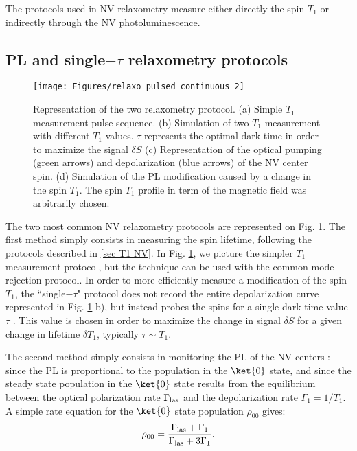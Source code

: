 \documentclass[a4paper,11pt]{report}
\begin{document}
The protocols used in NV relaxometry measure either directly the spin $T_1$ or indirectly through the NV photoluminescence.

\subsection{PL and single$-\tau$ relaxometry protocols}
\begin{figure}[h]
\centering
\texttt{[image: Figures/relaxo\_pulsed\_continuous\_2]}
\caption{Representation of the two relaxometry protocol. (a) Simple $T_1$ measurement pulse sequence. (b) Simulation of two $T_1$ measurement with different $T_1$ values. $\tau$ represents the optimal dark time in order to maximize the signal $\delta S$ (c) Representation of the optical pumping (green arrows) and depolarization (blue arrows) of the NV center spin. (d) Simulation of the PL modification caused by a change in the spin $T_1$. The spin $T_1$ profile in term of the magnetic field was arbitrarily chosen.}
\label{T1 vs PL}
\end{figure}

The two most common NV relaxometry protocols are represented on Fig. \ref{T1 vs PL}. The first method simply consists in measuring the spin lifetime, following the protocols described in \ref{sec T1 NV}. In Fig. \ref{T1 vs PL}, we picture the simpler $T_1$ measurement protocol, but the technique can be used with the common mode rejection protocol. In order to more efficiently measure a modification of the spin $T_1$, the ``single$-\tau$" protocol does not record the entire depolarization curve represented in Fig. \ref{T1 vs PL}-b), but instead probes the spins for a single dark time value $\tau$ \citep{pelliccione2014two, schmid2015relaxometry, tetienne2016scanning}. This value is chosen in order to maximize the change in signal $\delta S$ for a given change in lifetime $\delta T_1$, typically $\tau \sim T_1$.

 The second method simply consists in monitoring the PL of the NV centers : since the PL is proportional to the population in the $\ket{0}$ state, and since the steady state population in the $\ket{0}$ state results from the equilibrium between the optical polarization rate $\Gamma_{\rm las}$ and the depolarization rate $\Gamma_1=1/T_1$. A simple rate equation for the $\ket{0}$ state population $\rho_{00}$ gives:
 \begin{equation}
 \rho_{00}=\frac{\Gamma_{\rm las}+\Gamma_1}{\Gamma_{\rm las}+3\Gamma_1}.
 \end{equation}
 
\end{document}
